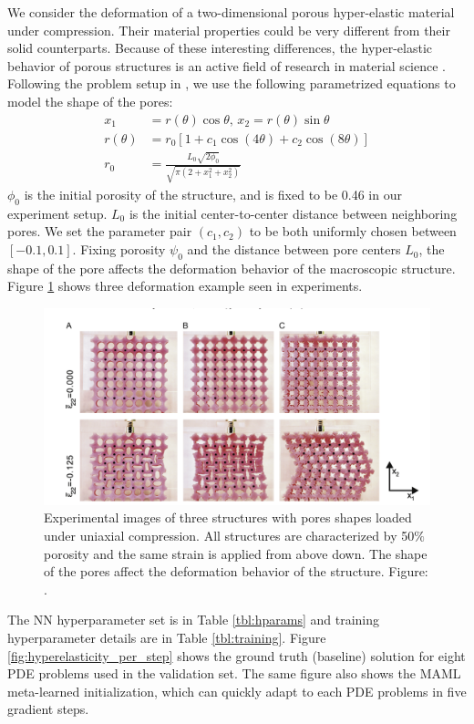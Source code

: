 We consider the deformation of a two-dimensional porous hyper-elastic material under compression. Their material properties could be very different from their solid counterparts. Because of these interesting differences, the hyper-elastic behavior of porous structures is an active field of research in material science \citep{overvelde2014relating, overvelde2012compaction}. Following the problem setup in \citep{overvelde2014relating}, we use the following parametrized equations to model the shape of the pores:
\begin{align*}
    x_1 &= r(\theta)\cos \theta, \, x_2 = r(\theta)\sin \theta \\
    r(\theta) &= r_0 \left[ 1 + c_1 \cos(4 \theta) + c_2\cos(8\theta)\right] \\
    r_0 &= \frac{L_0 \sqrt{2\phi_0}}{\sqrt{\pi \left(2 + x_1^2 + x_2^2\right)}}
\end{align*}
$\phi_0$ is the initial porosity of the structure, and is fixed to be 0.46 in our experiment setup. $L_0$ is the initial center-to-center distance between neighboring pores. We set the parameter pair $(c_1, c_2)$ to be both uniformly chosen between $[-0.1, 0.1]$. Fixing porosity $\psi_0$ and the distance between pore centers $L_0$, the shape of the pore affects the deformation behavior of the macroscopic structure. Figure \ref{fig:hyper-elasticity-example} shows three deformation example seen in experiments. 
\begin{figure}[H]
  \centering
\includegraphics[width=0.8\linewidth]{figures/hyper_elasticity_example.png}
\caption{Experimental images of three structures with pores shapes loaded under uniaxial compression. All structures are characterized by 50$\%$ porosity and the same strain is applied from above down. The shape of the pores affect the deformation behavior of the structure.
Figure: \citet{overvelde2014relating}.}
\label{fig:hyper-elasticity-example}%
\end{figure}

The NN hyperparameter set is in Table \ref{tbl:hparams} and training hyperparameter details are in Table \ref{tbl:training}. Figure \ref{fig:hyperelasticity_per_step} shows the ground truth (baseline) solution for eight PDE problems used in the validation set. The same figure also shows the MAML meta-learned initialization, which can quickly adapt to each PDE problems in five gradient steps. 

